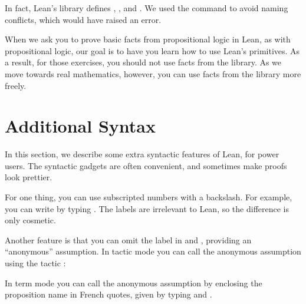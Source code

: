 \documentclass[letterpaper,10pt,english]{sphinxmanual}
\begin{document}
\sphinxAtStartPar
In fact, Lean’s library defines , ,
and .
We used the  command to avoid naming conflicts,
which would have raised an error.

\sphinxAtStartPar
When we ask you to prove basic facts from propositional logic in Lean, as with propositional logic, our goal is to have you learn how to use Lean’s primitives. As a result, for those exercises, you should not use facts from the library. As we move towards real mathematics, however, you can use facts from the library more freely.


\section{Additional Syntax}
\label{\detokenize{propositional_logic_in_lean:additional-syntax}}
\sphinxAtStartPar
In this section, we describe some extra syntactic features of Lean, for power users. The syntactic gadgets are often convenient, and sometimes make proofs look prettier.

\sphinxAtStartPar
For one thing, you can use subscripted numbers with a backslash. For example, you can write  by typing . The labels are irrelevant to Lean, so the difference is only cosmetic.

\sphinxAtStartPar
Another feature is that you can omit the label in  and ,
providing an “anonymous” assumption.
In tactic mode you can call the anonymous assumption
using the tactic :

\begin{sphinxVerbatim}[commandchars=\\\{\}]
        
     
   
\end{sphinxVerbatim}

\sphinxAtStartPar
In term mode you can call the anonymous assumption
by enclosing the proposition name in French quotes,
given by typing  and .
\end{document}

